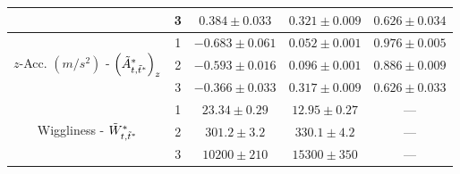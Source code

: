 \begin{table}[ht]
{\begin{tabular}{ccccc}
                                                                                   & 3                                    & $0.384  \pm 0.033$  & $0.321 \pm 0.009$ & $0.626 \pm 0.034$ \\ \hline
    \multirow{3}{*}{$z$-Acc. $(m/s^2)$ - $\left(\tilde{A}^*_{t,\tilde t^*}\right)_z$}     & 1                                    & $-0.683 \pm 0.061$  & $0.052 \pm 0.001$ & $0.976 \pm 0.005$ \\
                                                                                   & 2                                    & $-0.593 \pm 0.016$  & $0.096 \pm 0.001$ & $0.886 \pm 0.009$ \\
                                                                                   & 3                                    & $-0.366 \pm 0.033$  & $0.317 \pm 0.009$ & $0.626 \pm 0.033$ \\ \hline
    \multirow{3}{*}{Wiggliness - $\tilde{W}^*_{t,\tilde t^*}$}                                  & 1                                    & $23.34  \pm 0.29$   & $12.95 \pm 0.27$  & ---               \\
                                                                                   & 2                                    & $301.2  \pm 3.2$    & $330.1 \pm 4.2$   & ---               \\
                                                                                   & 3                                    & $10200  \pm 210$    & $15300 \pm 350$   & ---               \\ \hline
    \end{tabular}
    }
    \label{table:emis_dists_CarHHMM-DFT}
\end{table}

